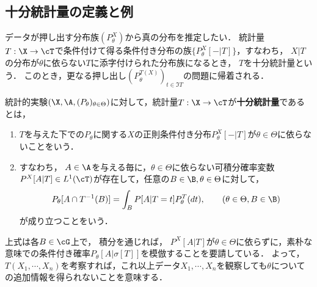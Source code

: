 \documentclass[uplatex,dvipdfmx]{jsreport}
\begin{document}
\subsection{十分統計量の定義と例}

\begin{tcolorbox}[colframe=ForestGreen, colback=ForestGreen!10!white,breakable,colbacktitle=ForestGreen!40!white,coltitle=black,fonttitle=\bfseries\sffamily,
title=未知パラメータの除去]
    データが押し出す分布族$(P^X_\theta)$から真の分布を推定したい．
    統計量$T:\X\to\cT$で条件付けて得る条件付き分布の族$\{P^X_\theta[-|T]\}$，すなわち，
    $X|T$の分布が$\theta$に依らない$T$に添字付けられた分布族になるとき，
    $T$を十分統計量という．
    このとき，更なる押し出し$(P^{T(X)}_\theta)_{t\in\Im T}$の問題に帰着される．
\end{tcolorbox}

\begin{definition}
    統計的実験$(\X,\A,(P_\theta)_{\theta\in\Theta})$に対して，統計量$T:\X\to\cT$が\textbf{十分統計量}であるとは，
    \begin{enumerate}
        \item $T$を与えた下での$P_\theta$に関する$X$の正則条件付き分布$P_\theta^X[-|T]$が$\theta\in\Theta$に依らないことをいう．
        \item すなわち，
        $A\in\A$を与える毎に，$\theta\in\Theta$に依らない可積分確率変数$P^X[A|T]\in L^1(\cT)$が存在して，任意の$B\in\B,\theta\in\Theta$に対して，
        \[P_\theta[A\cap T^{-1}(B)]=\int_BP[A|T=t]P^T_\theta(dt),\qquad(\theta\in\Theta,B\in\B)\]
        が成り立つことをいう．
    \end{enumerate}
\end{definition}
\begin{remarks}[十分統計量の意味]
    上式は各$B\in\cG$上で，
    積分を通じれば，
    $P^X[A|T]$が$\theta\in\Theta$に依らずに，素朴な意味での条件付き確率$P_\theta[A|\sigma[T]]$を模倣することを要請している．
    よって，$T(X_1,\cdots,X_n)$を考察すれば，これ以上データ$X_1,\cdots,X_n$を観察しても$\theta$についての追加情報を得られないことを意味する．
\end{remarks}
\end{document}

